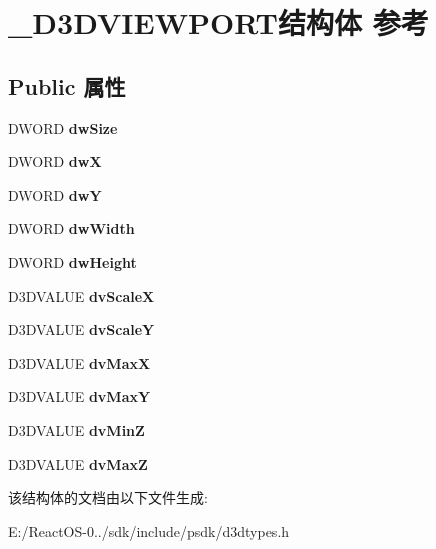 \hypertarget{struct___d3_d_v_i_e_w_p_o_r_t}{}\section{\+\_\+\+D3\+D\+V\+I\+E\+W\+P\+O\+R\+T结构体 参考}
\label{struct___d3_d_v_i_e_w_p_o_r_t}
\subsection*{Public 属性}
\begin{DoxyCompactItemize}
\item 
\mbox{\label{struct___d3_d_v_i_e_w_p_o_r_t_a845043f84662ef3f52a3e5870b6466b7}} 
D\+W\+O\+RD {\bfseries dw\+Size}
\item 
\mbox{\label{struct___d3_d_v_i_e_w_p_o_r_t_a944bb17cd204c8210208631cc935b9a3}} 
D\+W\+O\+RD {\bfseries dwX}
\item 
\mbox{\label{struct___d3_d_v_i_e_w_p_o_r_t_adac9535b3b92a413de5846f4d32c9806}} 
D\+W\+O\+RD {\bfseries dwY}
\item 
\mbox{\label{struct___d3_d_v_i_e_w_p_o_r_t_a86803a47aa283276afac77aa51a9fda3}} 
D\+W\+O\+RD {\bfseries dw\+Width}
\item 
\mbox{\label{struct___d3_d_v_i_e_w_p_o_r_t_a01ab673615c3f97d89805214a0e56c83}} 
D\+W\+O\+RD {\bfseries dw\+Height}
\item 
\mbox{\label{struct___d3_d_v_i_e_w_p_o_r_t_ae11a500333abfdee653d7fc6f64a191c}} 
D3\+D\+V\+A\+L\+UE {\bfseries dv\+ScaleX}
\item 
\mbox{\label{struct___d3_d_v_i_e_w_p_o_r_t_a7c62d7697330bc7c9b97bc5895cb0fbd}} 
D3\+D\+V\+A\+L\+UE {\bfseries dv\+ScaleY}
\item 
\mbox{\label{struct___d3_d_v_i_e_w_p_o_r_t_a113cec61ba7e54d75dc92c954c70c5df}} 
D3\+D\+V\+A\+L\+UE {\bfseries dv\+MaxX}
\item 
\mbox{\label{struct___d3_d_v_i_e_w_p_o_r_t_a9f94c7c5ab4b04de4978e1c9d3a0a806}} 
D3\+D\+V\+A\+L\+UE {\bfseries dv\+MaxY}
\item 
\mbox{\label{struct___d3_d_v_i_e_w_p_o_r_t_af62fce530431eb94d5e2dcdc2a29fdb5}} 
D3\+D\+V\+A\+L\+UE {\bfseries dv\+MinZ}
\item 
\mbox{\label{struct___d3_d_v_i_e_w_p_o_r_t_a5371a87cc14e67fef0a446466b86d397}} 
D3\+D\+V\+A\+L\+UE {\bfseries dv\+MaxZ}
\end{DoxyCompactItemize}


该结构体的文档由以下文件生成\+:\begin{DoxyCompactItemize}
\item 
E\+:/\+React\+O\+S-\/0../sdk/include/psdk/d3dtypes.\+h\end{DoxyCompactItemize}
